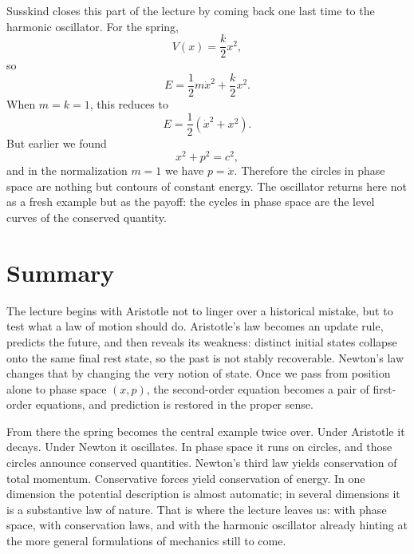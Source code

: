 Susskind closes this part of the lecture by coming back one last time to the harmonic oscillator. For the spring,
\begin{equation}
V(x)=\frac{k}{2}x^2,
\end{equation}
so
\begin{equation}
E=\frac12 m\dot x^2+\frac{k}{2}x^2.
\end{equation}
When \(m=k=1\), this reduces to
\begin{equation}
E=\frac12\left(\dot x^2+x^2\right).
\end{equation}
But earlier we found
\begin{equation}
x^2+p^2=c^2,
\end{equation}
and in the normalization \(m=1\) we have \(p=\dot x\). Therefore the circles in phase space are nothing but contours of constant energy. The oscillator returns here not as a fresh example but as the payoff: the cycles in phase space are the level curves of the conserved quantity.

\section{Summary}

The lecture begins with Aristotle not to linger over a historical mistake, but to test what a law of motion should do. Aristotle's law becomes an update rule, predicts the future, and then reveals its weakness: distinct initial states collapse onto the same final rest state, so the past is not stably recoverable. Newton's law changes that by changing the very notion of state. Once we pass from position alone to phase space \((x,p)\), the second-order equation becomes a pair of first-order equations, and prediction is restored in the proper sense.

From there the spring becomes the central example twice over. Under Aristotle it decays. Under Newton it oscillates. In phase space it runs on circles, and those circles announce conserved quantities. Newton's third law yields conservation of total momentum. Conservative forces yield conservation of energy. In one dimension the potential description is almost automatic; in several dimensions it is a substantive law of nature. That is where the lecture leaves us: with phase space, with conservation laws, and with the harmonic oscillator already hinting at the more general formulations of mechanics still to come.